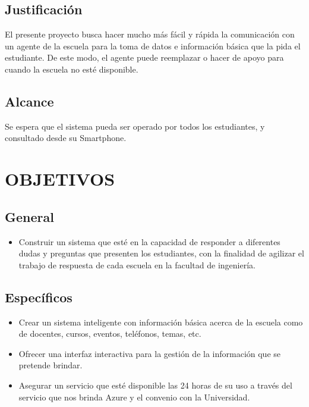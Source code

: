 \documentclass[12pt,letterpaper]{article}
\begin{document}
	\subsection{Justificación}
El presente proyecto busca hacer mucho más fácil y rápida la comunicación con un agente de la escuela para la toma de datos e información básica que la pida el estudiante. De este modo, el agente puede reemplazar o hacer de apoyo para cuando la escuela no esté disponible.
	\subsection{Alcance}
Se espera que el sistema pueda ser operado por todos los estudiantes, y consultado desde su Smartphone.

\section{OBJETIVOS}
	\subsection{General}
\begin{itemize}
	\item Construir un sistema que esté en la capacidad de responder a diferentes dudas y preguntas que presenten los estudiantes, con la finalidad de agilizar el trabajo de respuesta de cada escuela en la facultad de ingeniería.
\end{itemize}

	\subsection{Específicos}
\begin{itemize}
	\item Crear un sistema inteligente con información básica acerca de la escuela como de docentes, cursos, eventos, teléfonos, temas, etc.
	\item Ofrecer una interfaz interactiva para la gestión de la información que se pretende brindar.
	\item Asegurar un servicio que esté disponible las 24 horas de su uso a través del servicio que nos brinda Azure y el convenio con la Universidad.
\end{itemize}



\end{document}
